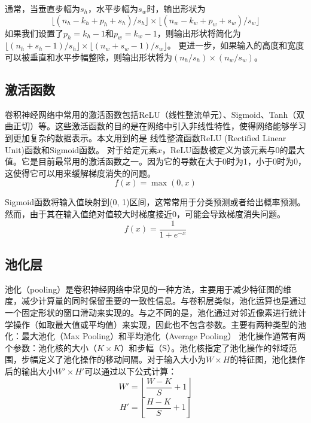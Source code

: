 通常，当垂直步幅为$s_h$，水平步幅为$s_w$时，输出形状为
\begin{equation}
  \lfloor(n_h-k_h+p_h+s_h)/s_h\rfloor \times \lfloor(n_w-k_w+p_w+s_w)/s_w\rfloor
\end{equation}
如果我们设置了$p_h=k_h-1$和$p_w=k_w-1$，则输出形状将简化为$\lfloor(n_h+s_h-1)/s_h\rfloor \times \lfloor(n_w+s_w-1)/s_w\rfloor$。 更进一步，如果输入的高度和宽度可以被垂直和水平步幅整除，则输出形状将为$(n_h/s_h) \times (n_w/s_w)$。
\subsection{激活函数}
卷积神经网络中常用的激活函数包括ReLU（线性整流单元）\cite{2018DeepLearningusingRectifiedLinearUnitsReLU}、Sigmoid\cite{2023SigmoidLossLanguageImagePreTraining}、Tanh（双曲正切）\cite{2021ActivationFunctionsDeepLearningComprehensiveSurveyBenchmark}等。这些激活函数的目的是在网络中引入非线性特性，使得网络能够学习到更加复杂的数据表示。本文用到的是 线性整流函数ReLU (Rectified Linear Unit)函数和Sigmoid函数。
对于给定元素$x$，ReLU函数被定义为该元素与$0$的最大值。它是目前最常用的激活函数之一。因为它的导数在大于0时为1，小于0时为0，这使得它可以用来缓解梯度消失的问题。
\begin{equation}
  f(x) = \max(0, x)
\end{equation}

Sigmoid函数将输入值映射到(0, 1)区间，这常常用于分类预测或者给出概率预测。然而，由于其在输入值绝对值较大时梯度接近0，可能会导致梯度消失问题。
\begin{equation}
  f(x) = \frac{1}{1 + e^{-x}}
\end{equation}

\subsection{池化层}
池化（pooling）\cite{2022ComparisonPoolingMethodsConvolutionalNeuralNetworks}是卷积神经网络中常见的一种方法，主要用于减少特征图的维度，减少计算量的同时保留重要的一致性信息。与卷积层类似，池化运算也是通过一个固定形状的窗口滑动来实现的。与之不同的是，池化通过对邻近像素进行统计学操作（如取最大值或平均值）来实现，因此也不包含参数。主要有两种类型的池化：最大池化（Max Pooling）\cite{2011Maxpoolingconvolutionalneuralnetworksvisionbasedhandgesturerecognition}和平均池化（Average Pooling）\cite{2022ComparisonPoolingMethodsConvolutionalNeuralNetworks}
池化操作通常有两个参数：池化核的大小（\(K \times K\)）和步幅（S）。池化核指定了池化操作的邻域范围，步幅定义了池化操作的移动间隔。对于输入大小为$W \times H$的特征图，池化操作后的输出大小$W' \times H'$可以通过以下公式计算：
\begin{equation}
  W' = \left\lfloor\frac{W - K}{S} + 1\right\rfloor
\end{equation}
\begin{equation}
  H' = \left\lfloor\frac{H - K}{S} + 1\right\rfloor
\end{equation}

